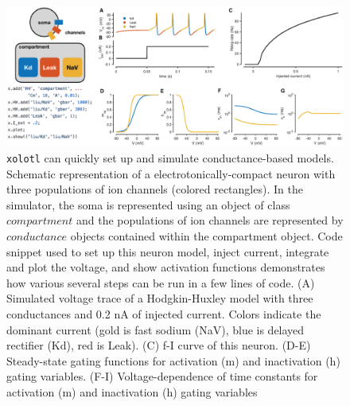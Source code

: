 \documentclass{frontiersSCNS} %
\begin{document}
\begin{figure}
	\centering
	\includegraphics[width=1.0\linewidth]{gfx/figure_HH}
	\caption{\texttt{xolotl} can quickly set up and simulate conductance-based models. Schematic representation of a electrotonically-compact neuron with three populations of ion channels (colored rectangles). In the simulator, the soma is represented using an object of class $compartment$ and the populations of ion channels are represented by $conductance$ objects contained within the compartment object. Code snippet used to set up this neuron model, inject current, integrate and plot the voltage, and show activation functions demonstrates how various several steps can be run in a few lines of code. (A) Simulated voltage trace of a Hodgkin-Huxley model with three conductances and 0.2 nA of injected current. Colors indicate the dominant current (gold is fast sodium (NaV), blue is delayed rectifier (Kd), red is Leak). (C) f-I curve of this neuron. (D-E) Steady-state gating functions for activation (m) and inactivation (h) gating variables. (F-I) Voltage-dependence of time constants for activation (m) and inactivation (h) gating variables}
	\label{fig:figurehh}
\end{figure}
\end{document}
